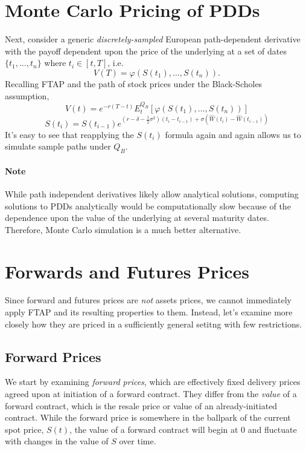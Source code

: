 \documentclass[12pt]{article}
\theoremstyle{plain}
\theoremstyle{definition}
\theoremstyle{remark}
\begin{document}
\newpage

\section{Monte Carlo Pricing of PDDs}

Next, consider a generic \emph{discretely-sampled} European 
path-dependent derivative with the payoff dependent upon the price of 
the underlying at a set of dates $\{t_1, \ldots, t_n\}$ where 
$t_i \in [t, T]$, i.e.
   \[ V(T) = \varphi(S(t_1), \ldots, S(t_n)).\]
Recalling FTAP and the path of stock prices under the Black-Scholes 
assumption, 
   \[ V(t) = e^{-r(T-t)} E_t^{Q_B} \left[\varphi(S(t_1), \ldots, S(t_n))
      \right] \]
   \[ S(t_i) = S(t_{i-1}) e^{\left(r-\delta - \frac{1}{2}\sigma^2\right)
      (t_i - t_{i-1}) + \sigma \left(\hat{W}(t_i) - \hat{W}(t_{i-1})
      \right)} \]
It's easy to see that reapplying the $S(t_i)$ formula again and again
allows us to simulate sample paths under $Q_B$.

\paragraph{Note} While path independent derivatives likely allow
analytical solutions, computing solutions to PDDs analytically would
be computationally slow because of the dependence upon the value of the
underlying at several maturity dates.  Therefore, Monte Carlo
simulation is a much better alternative.

\newpage

\section{Forwards and Futures Prices}

Since forward and futures prices are \emph{not} assets prices, 
we cannot immediately apply FTAP and its resulting properties to them.
Instead, let's examine more closely how they are priced in a sufficiently
general setitng with few restrictions.

\subsection{Forward Prices}

We start by examining \emph{forward prices}, which are effectively
fixed delivery prices agreed upon at initiation of a forward contract. 
They differ from the \emph{value} of
a forward contract, which is the resale price or value of an 
already-initiated contract. While the forward price is 
somewhere in the ballpark of the current spot price, $S(t)$, the 
value of a forward contract will begin at 0 and fluctuate with changes
in the value of $S$ over time.
\end{document}
